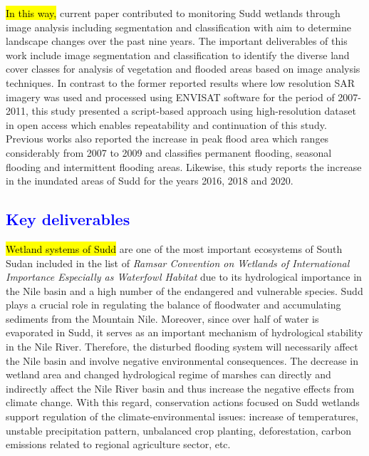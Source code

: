 \documentclass[analytics,article,submit,pdftex,moreauthors]{Definitions/mdpi}
\begin{document}
\hl{In this way, }current paper contributed to monitoring Sudd wetlands through image analysis including segmentation and classification with aim to determine landscape changes over the past nine years. The important deliverables of this work include image segmentation and classification to identify the diverse land cover classes for analysis of vegetation and flooded areas based on image analysis techniques. In contrast to the former reported results \cite{WILUSZ2017205} where low resolution SAR imagery was used and processed using ENVISAT software for the period of 2007-2011, this study presented a script-based approach using high-resolution dataset in open access which enables repeatability and continuation of this study. Previous works also reported the increase in peak flood area which ranges considerably from 2007 to 2009 and classifies permanent flooding, seasonal flooding and intermittent flooding areas. Likewise, this study reports the increase in the inundated areas of Sudd for the years 2016, 2018 and 2020. 

\subsection{\textcolor{blue}{Key deliverables}}
\hl{Wetland systems of Sudd} are one of the most important ecosystems of South Sudan included in the list of \emph{Ramsar Convention on Wetlands of International Importance Especially as Waterfowl Habitat} due to its hydrological importance in the Nile basin and a high number of the endangered and vulnerable species. Sudd plays a crucial role in regulating the balance of floodwater and accumulating sediments from the Mountain Nile. Moreover, since over half of water is evaporated in Sudd, it serves as an important mechanism of hydrological stability in the Nile River. Therefore, the disturbed flooding system will necessarily affect the Nile basin and involve negative environmental consequences. The decrease in wetland area and changed hydrological regime of marshes can directly and indirectly affect the Nile River basin and thus increase the negative effects from climate change. With this regard, conservation actions focused on Sudd wetlands support regulation of the climate-environmental issues: increase of temperatures, unstable precipitation pattern, unbalanced crop planting, deforestation, carbon emissions related to regional agriculture sector, etc.
\end{document}

